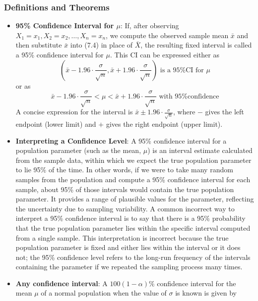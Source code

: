 \documentclass{report}
\begin{document}
    \subsubsection{Definitions and Theorems}
    \begin{itemize}
        \item \textbf{95\% Confidence Interval for $\mu$}: 
            If, after observing $X_1 = x_1, X_2 = x_2, \ldots, X_n = x_n$, we compute the observed sample mean $\bar{x}$ and then substitute $\bar{x}$ into (7.4) in place of $\bar{X}$, the resulting fixed interval is called a 95\% confidence interval for $\mu$. This CI can be expressed either as
            \[
                \left( \bar{x} - 1.96 \cdot \frac{\sigma}{\sqrt{n}}, \bar{x} + 1.96 \cdot \frac{\sigma}{\sqrt{n}} \right) \text{ is a 95\% CI for } \mu
            \]
            or as
            \[
                \bar{x} - 1.96 \cdot \frac{\sigma}{\sqrt{n}} < \mu < \bar{x} + 1.96 \cdot \frac{\sigma}{\sqrt{n}} \text{ with 95\% confidence}
            \]
            A concise expression for the interval is $\bar{x} \pm 1.96 \cdot \frac{\sigma}{\sqrt{n}}$, where $-$ gives the left endpoint (lower limit) and $+$ gives the right endpoint (upper limit).
        \item \textbf{Interpreting a Confidence Level}:
            A 95\% confidence interval for a population parameter (such as the mean, $\mu$) is an interval estimate calculated from the sample data, within which we expect the true population parameter to lie 95\% of the time. In other words, if we were to take many random samples from the population and compute a 95\% confidence interval for each sample, about 95\% of those intervals would contain the true population parameter. It provides a range of plausible values for the parameter, reflecting the uncertainty due to sampling variability.
            \bigbreak \noindent 
            A common incorrect way to interpret a 95\% confidence interval is to say that there is a 95\% probability that the true population parameter lies within the specific interval computed from a single sample. This interpretation is incorrect because the true population parameter is fixed and either lies within the interval or it does not; the 95\% confidence level refers to the long-run frequency of the intervals containing the parameter if we repeated the sampling process many times.
        \item \textbf{Any confidence interval}:
            A \( 100(1 - \alpha) \% \) confidence interval for the mean \(\mu\) of a normal population when the value of \(\sigma\) is known is given by

\end{itemize}
\end{document}
